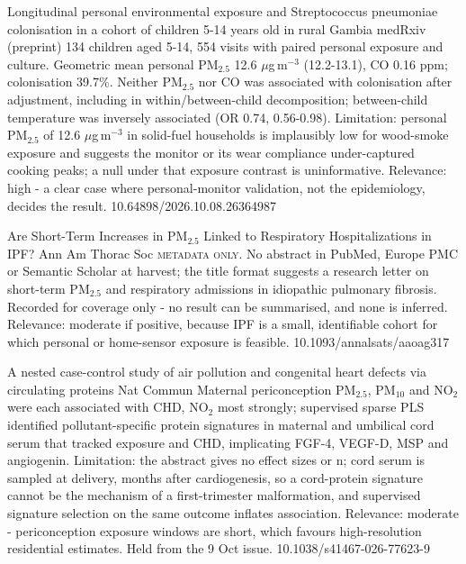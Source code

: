 \documentclass[10pt]{article}
\begin{document}
{Longitudinal personal environmental exposure and Streptococcus pneumoniae colonisation in a cohort of children 5-14 years old in rural Gambia}
{medRxiv (preprint)}
{134 children aged 5-14, 554 visits with paired personal exposure and culture. Geometric mean personal PM$_{2.5}$ 12.6 $\mu$g\,m$^{-3}$ (12.2-13.1), CO 0.16 ppm; colonisation 39.7\%. Neither PM$_{2.5}$ nor CO was associated with colonisation after adjustment, including in within/between-child decomposition; between-child temperature was inversely associated (OR 0.74, 0.56-0.98). Limitation: personal PM$_{2.5}$ of 12.6 $\mu$g\,m$^{-3}$ in solid-fuel households is implausibly low for wood-smoke exposure and suggests the monitor or its wear compliance under-captured cooking peaks; a null under that exposure contrast is uninformative. Relevance: high - a clear case where personal-monitor validation, not the epidemiology, decides the result.}
{10.64898/2026.10.08.26364987}

{Are Short-Term Increases in PM$_{2.5}$ Linked to Respiratory Hospitalizations in IPF?}
{Ann Am Thorac Soc}
{\textsc{metadata only.} No abstract in PubMed, Europe PMC or Semantic Scholar at harvest; the title format suggests a research letter on short-term PM$_{2.5}$ and respiratory admissions in idiopathic pulmonary fibrosis. Recorded for coverage only - no result can be summarised, and none is inferred. Relevance: moderate if positive, because IPF is a small, identifiable cohort for which personal or home-sensor exposure is feasible.}
{10.1093/annalsats/aaoag317}

\par{}\baselineskip{}\baselineskip
{}

{A nested case-control study of air pollution and congenital heart defects via circulating proteins}
{Nat Commun}
{Maternal periconception PM$_{2.5}$, PM$_{10}$ and NO$_2$ were each associated with CHD, NO$_2$ most strongly; supervised sparse PLS identified pollutant-specific protein signatures in maternal and umbilical cord serum that tracked exposure and CHD, implicating FGF-4, VEGF-D, MSP and angiogenin. Limitation: the abstract gives no effect sizes or n; cord serum is sampled at delivery, months after cardiogenesis, so a cord-protein signature cannot be the mechanism of a first-trimester malformation, and supervised signature selection on the same outcome inflates association. Relevance: moderate - periconception exposure windows are short, which favours high-resolution residential estimates. Held from the 9 Oct issue.}
{10.1038/s41467-026-77623-9}
\end{document}

